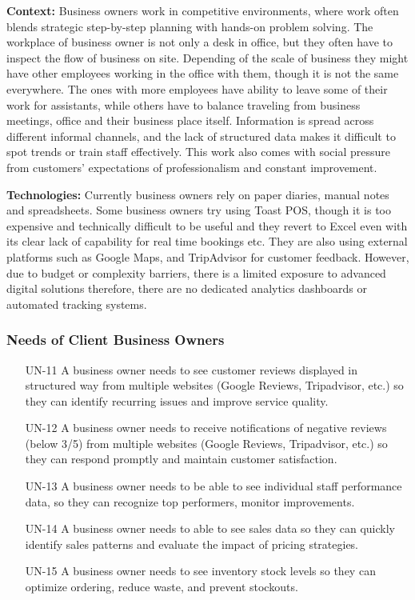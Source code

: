 \documentclass[]{VUMIFTemplateClass}
\newcommand{\noticecomment}[1]{%
    \begin{tcolorbox}[colback=blue!20, colframe=blue!60, arc=0pt, outer arc=0pt, boxrule=1pt, left=3pt, right=3pt, top=3pt, bottom=3pt]
        \textbf{\textcolor{blue!70!black}{NOTE:}} #1
    \end{tcolorbox}
}
\begin{document}
    \textbf{Context:} Business owners work in competitive environments, where
work often blends strategic step-by-step planning with hands-on problem solving.
The workplace of business owner is not only a desk in office, but they often
have to inspect the flow of business on site. Depending of the scale of business
they might have other employees working in the office with them, though it is
not the same everywhere. The ones with more employees have ability to leave some
of their work for assistants, while others have to balance traveling from
business meetings, office and their business place itself. Information is spread
across different informal channels, and the lack of structured data makes it
difficult to spot trends or train staff effectively. This work also comes with
social pressure from customers' expectations of professionalism and constant
improvement.

    \textbf{Technologies:} Currently business owners rely on paper diaries,
manual notes and spreadsheets. Some business owners try using Toast POS, though
it is too expensive and technically difficult to be useful and they revert to
Excel even with its clear lack of capability for real time bookings etc. They
are also using external platforms such as Google Maps, and TripAdvisor for
customer feedback. However, due to budget or complexity barriers, there is a
limited exposure to advanced digital solutions therefore, there are no dedicated
analytics dashboards or automated tracking systems.

\subsubsection{Needs of Client Business Owners}
\begin{itemize}
    \item[UN-11]\label{UN-11} A business owner needs to see customer reviews displayed in structured way from multiple websites (Google Reviews, Tripadvisor, etc.) so they can identify recurring issues and improve service quality.
    \item[UN-12]\label{UN-12} A business owner needs to receive notifications of negative reviews (below 3/5) from multiple websites (Google Reviews, Tripadvisor, etc.) so they can respond promptly and maintain customer satisfaction.
    \item[UN-13]\label{UN-13} A business owner needs to be able to see individual staff performance data, so they can recognize top performers, monitor improvements.
    \item[UN-14]\label{UN-14} A business owner needs to able to see sales data so they can quickly identify sales patterns and evaluate the impact of pricing strategies. 
    \item[UN-15]\label{UN-15} A business owner needs to see inventory stock levels so they can optimize ordering, reduce waste, and prevent stockouts.

\end{itemize}
\end{document}
